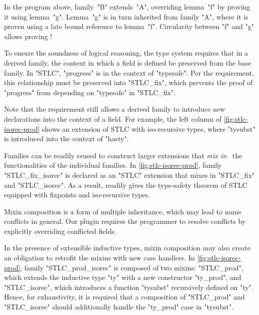 \noindent
In the program above, family~"B" extends~"A", overriding lemma~"f" by
proving it using lemma~"g".
Lemma~"g" is in turn inherited from family "A", where it is proven using
a late bound reference to lemma~"f".
Circularity between "f" and "g" allows proving !

To ensure the soundness of logical reasoning, the type system requires
that in a derived family, the context in which a field is defined be
preserved from the base family.
In "STLC", "progress" is in the context of "typesafe".
Per the requirement, this relationship must be preserved into
"STLC_fix", which prevents the proof of "progress" from depending on
"typesafe" in "STLC_fix".

Note that the requirement still allows a derived family to introduce
new declarations into the context of a field.
For example, the left column of \cref{fig:stlc-isorec-prod} shows an
extension of STLC with iso-recursive types, where "tysubst" is
introduced into the context of "hasty".




Families can be readily reused to construct larger extensions that
\emph{mix in}~\cite{mixin-1990} the functionalities of the individual
families.
In \cref{fig:stlc-isorec-prod}, family "STLC_fix_isorec" is declared as
an "STLC" extension that mixes in "STLC_fix" and "STLC_isorec".
As a result,  readily gives the
type-safety theorem of STLC equipped with fixpoints and iso-recursive types.

Mixin composition is a form of multiple inheritance, which may lead to
name conflicts in general.
Our plugin requires the programmer to resolve conflicts by
explicitly overriding conflicted fields.

In the presence of extensible inductive types, mixin composition may
also create an obligation to retrofit the mixins with new case handlers.
In \cref{fig:stlc-isorec-prod}, family "STLC_prod_isorec" is composed
of two mixins: "STLC_prod", which extends the inductive type "ty" with a
new constructor "ty_prod", and "STLC_isorec", which introduces a
function "tysubst" recursively defined on "ty".
Hence, for exhaustivity, it is required that a composition of
"STLC_prod" and "STLC_isorec" should additionally handle the "ty_prod"
case in "tysubst".



